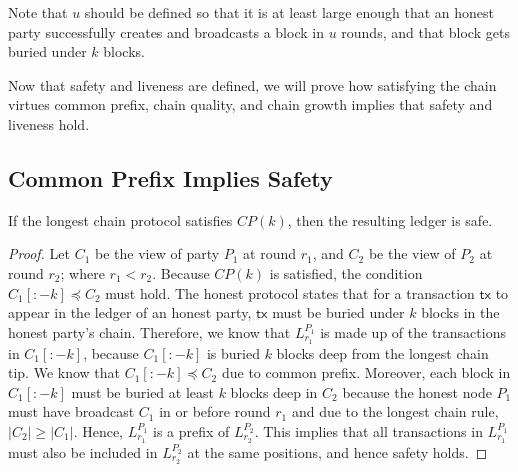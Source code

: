 Note that $u$ should be defined so that it is at least large enough that an honest party successfully creates and broadcasts a block in $u$ rounds, and that block gets buried under $k$ blocks.

Now that safety and liveness are defined, we will prove how satisfying the chain virtues common prefix, chain quality, and chain growth implies that safety and liveness hold.

\subsection{Common Prefix Implies Safety}

\begin{theorem} If the longest chain protocol satisfies $CP(k)$, then the resulting ledger is safe.
\end{theorem}

\begin{proof}
    Let $C_1$ be the view of party $P_1$ at round $r_1$, and $C_2$ be the view of $P_2$ at round $r_2$; where $r_1 < r_2$. Because $CP(k)$ is satisfied, the condition $C_1[:-k] \preceq C_2$ must hold. The honest protocol states that for a transaction $\mathsf{tx}$ to appear in the ledger of an honest party, $\mathsf{tx}$ must be buried under $k$ blocks in the honest party's chain. Therefore, we know that $L^{P_1}_{r_1}$ is made up of the transactions in $C_1[:-k]$, because $C_1[:-k]$ is buried $k$ blocks deep from the longest chain tip.
    We know that $C_1[:-k] \preceq C_2$ due to common prefix. Moreover, each block in $C_1[:-k]$ must be buried at least $k$ blocks deep in $C_2$ because the honest node $P_1$ must have broadcast $C_1$ in or before round $r_1$ and due to the longest chain rule, $|C_2| \geq |C_1|$. Hence, $L^{P_1}_{r_1}$ is a prefix of $L^{P_2}_{r_2}$. This implies that all transactions in $L^{P_1}_{r_1}$ must also be included in $L^{P_2}_{r_2}$ at the same positions, and hence safety holds.
\end{proof}





